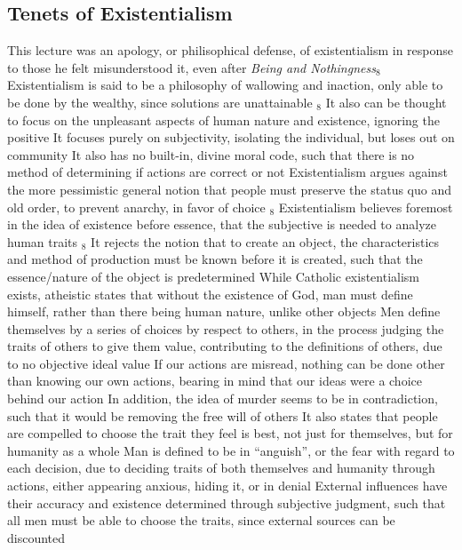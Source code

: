 \documentclass[11 pt, twoside]{article}
\newenvironment{outline*}
{
	\begin{outline}[enumerate]
	}
	{\end{outline}
}
\newcommand{\foota}[1]{\hyperlink{#1}{$_#1$}}
\begin{document}
\subsection{Tenets of Existentialism}
\begin{outline*}
\1 This lecture was an apology, or philisophical defense, of existentialism in response to those he felt misunderstood it, even after \textit{Being and Nothingness}\foota{8}
\1 Existentialism is said to be a philosophy of wallowing and inaction, only able to be done by the wealthy, since solutions are unattainable \foota{8}
\2 It also can be thought to focus on the unpleasant aspects of human nature and existence, ignoring the positive
\2 It focuses purely on subjectivity, isolating the individual, but loses out on community
\2 It also has no built-in, divine moral code, such that there is no method of determining if actions are correct or not
\1 Existentialism argues against the more pessimistic general notion that people must preserve the status quo and old order, to prevent anarchy, in favor of choice \foota{8}
\1 Existentialism believes foremost in the idea of existence before essence, that the subjective is needed to analyze human traits \foota{8}
\2 It rejects the notion that to create an object, the characteristics and method of production must be known before it is created, such that the essence/nature of the object is predetermined
\2 While Catholic existentialism exists, atheistic states that without the existence of God, man must define himself, rather than there being human nature, unlike other objects
\2 Men define themselves by a series of choices by respect to others, in the process judging the traits of others to give them value, contributing to the definitions of others, due to no objective ideal value
\1 If our actions are misread, nothing can be done other than knowing our own actions, bearing in mind that our ideas were a choice behind our action
\2 In addition, the idea of murder seems to be in contradiction, such that it would be removing the free will of others
\2 It also states that people are compelled to choose the trait they feel is best, not just for themselves, but for humanity as a whole
\1 Man is defined to be in ``anguish'', or the fear with regard to each decision, due to deciding traits of both themselves and humanity through actions, either appearing anxious, hiding it, or in denial
\2 External influences have their accuracy and existence determined through subjective judgment, such that all men must be able to choose the traits, since external sources can be discounted

\end{outline*}
\end{document}
